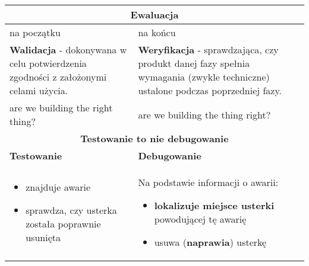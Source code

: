 \documentclass[../main.tex]{subfiles}
\begin{document}
    \begin{table}[H]
        \begin{center}
            \begin{tabular}{| p{8cm}| p{8cm}|}
                \hline
                \multicolumn{2}{|c|}{\textbf{Ewaluacja}}\\
                \hline
                na początku & na końcu\\
                \hline
                \textbf{Walidacja} - dokonywana w celu
                potwierdzenia zgodności z założonymi celami użycia. &
                \textbf{Weryfikacja} - sprawdzająca, czy produkt danej fazy spełnia wymagania
                (zwykle techniczne) ustalone podczas poprzedniej fazy.\\
                \hline
                are we building the right thing? & are we building the thing right?\\
                \hline
                \hline
                \multicolumn{2}{|c|}{\textbf{Testowanie to nie debugowanie}}\\
                \hline
                \textbf{Testowanie} & \textbf{Debugowanie}\\
                \hline
                \begin{itemize}
                    \item znajduje awarie
                    \item sprawdza, czy usterka została poprawnie usunięta
                \end{itemize}
                &
                Na podstawie informacji o awarii:
                \begin{itemize}
                    \item \textbf{lokalizuje miejsce usterki} powodującej tę awarię
                    \item usuwa (\textbf{naprawia}) usterkę
                \end{itemize}\\
                \hline
            \end{tabular}
        \end{center}
    \end{table}
\end{document}
